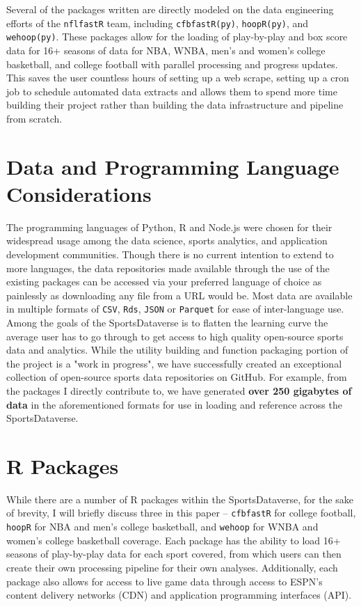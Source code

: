 \documentclass[12pt]{article}
\begin{document}
Several of the packages written are directly modeled on the data engineering efforts of the \texttt{nflfastR} team, including \texttt{cfbfastR(py)}\cite{gilani_etal_cfbfastr_2021}\cite{gilani_cfbfastRpy_2021}, \texttt{hoopR(py)}\cite{gilani_hoopRpy_2021}\cite{gilani_cfbfastRpy_2021}, and \texttt{wehoop(py)}\cite{hutchingson_gilani_2021}\cite{gilani_wehooppy_2021}. These packages allow for the loading of play-by-play and box score data for 16+ seasons of data for NBA, WNBA, men's and women's college basketball, and college football with parallel processing and progress updates. This saves the user countless hours of setting up a web scrape, setting up a cron job to schedule automated data extracts and allows them to spend more time building their project rather than building the data infrastructure and pipeline from scratch.  

\section{Data and Programming Language Considerations}
The programming languages of Python, R and Node.js were chosen for their widespread usage among the data science, sports analytics, and application development communities. Though there is no current intention to extend to more languages, the data repositories made available through the use of the existing packages can be accessed via your preferred language of choice as painlessly as downloading any file from a URL would be. Most data are available in multiple formats of \texttt{CSV}, \texttt{Rds}, \texttt{JSON} or \texttt{Parquet} for ease of inter-language use. Among the goals of the SportsDataverse is to flatten the learning curve the average user has to go through to get access to high quality open-source sports data and analytics. While the utility building and function packaging portion of the project is a "work in progress", we have successfully created an exceptional collection of open-source sports data repositories on GitHub. For example, from the packages I directly contribute to, we have generated \textbf{over 250 gigabytes of data} in the aforementioned formats for use in loading and reference across the SportsDataverse. 

\section{R Packages}
While there are a number of R packages within the SportsDataverse, for the sake of brevity, I will briefly discuss three in this paper -- \texttt{cfbfastR} for college football, \texttt{hoopR} for NBA and men's college basketball, and \texttt{wehoop} for WNBA and women's college basketball coverage. Each package has the ability to load 16+ seasons of play-by-play data for each sport covered, from which users can then create their own processing pipeline for their own analyses. Additionally, each package also allows for access to live game data through access to ESPN's content delivery networks (CDN) and application programming interfaces (API). 
\end{document}
